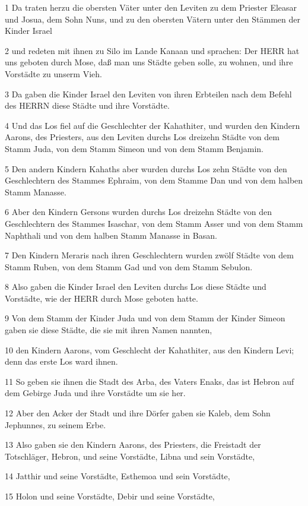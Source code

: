 \par 1 Da traten herzu die obersten Väter unter den Leviten zu dem Priester Eleasar und Josua, dem Sohn Nuns, und zu den obersten Vätern unter den Stämmen der Kinder Israel
\par 2 und redeten mit ihnen zu Silo im Lande Kanaan und sprachen: Der HERR hat uns geboten durch Mose, daß man uns Städte geben solle, zu wohnen, und ihre Vorstädte zu unserm Vieh.
\par 3 Da gaben die Kinder Israel den Leviten von ihren Erbteilen nach dem Befehl des HERRN diese Städte und ihre Vorstädte.
\par 4 Und das Los fiel auf die Geschlechter der Kahathiter, und wurden den Kindern Aarons, des Priesters, aus den Leviten durchs Los dreizehn Städte von dem Stamm Juda, von dem Stamm Simeon und von dem Stamm Benjamin.
\par 5 Den andern Kindern Kahaths aber wurden durchs Los zehn Städte von den Geschlechtern des Stammes Ephraim, von dem Stamme Dan und von dem halben Stamm Manasse.
\par 6 Aber den Kindern Gersons wurden durchs Los dreizehn Städte von den Geschlechtern des Stammes Isaschar, von dem Stamm Asser und von dem Stamm Naphthali und von dem halben Stamm Manasse in Basan.
\par 7 Den Kindern Meraris nach ihren Geschlechtern wurden zwölf Städte von dem Stamm Ruben, von dem Stamm Gad und von dem Stamm Sebulon.
\par 8 Also gaben die Kinder Israel den Leviten durchs Los diese Städte und Vorstädte, wie der HERR durch Mose geboten hatte.
\par 9 Von dem Stamm der Kinder Juda und von dem Stamm der Kinder Simeon gaben sie diese Städte, die sie mit ihren Namen nannten,
\par 10 den Kindern Aarons, vom Geschlecht der Kahathiter, aus den Kindern Levi; denn das erste Los ward ihnen.
\par 11 So geben sie ihnen die Stadt des Arba, des Vaters Enaks, das ist Hebron auf dem Gebirge Juda und ihre Vorstädte um sie her.
\par 12 Aber den Acker der Stadt und ihre Dörfer gaben sie Kaleb, dem Sohn Jephunnes, zu seinem Erbe.
\par 13 Also gaben sie den Kindern Aarons, des Priesters, die Freistadt der Totschläger, Hebron, und seine Vorstädte, Libna und sein Vorstädte,
\par 14 Jatthir und seine Vorstädte, Esthemoa und sein Vorstädte,
\par 15 Holon und seine Vorstädte, Debir und seine Vorstädte,

